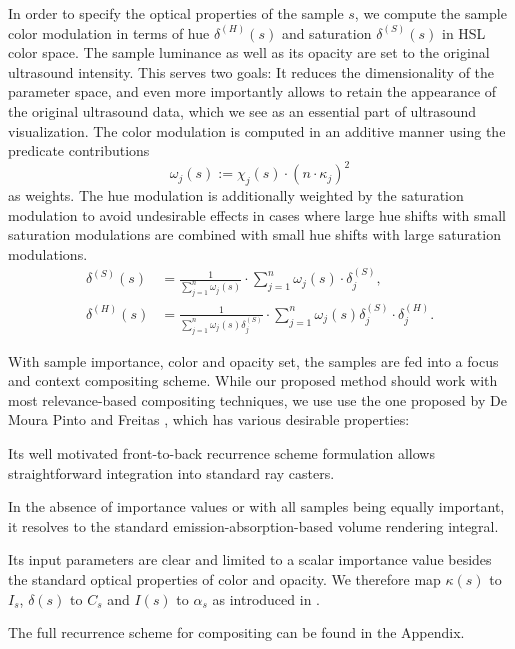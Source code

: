 In order to specify the optical properties of the sample $s$, we compute the sample color modulation in terms of hue $\delta^{(H)}(s)$ and saturation $\delta^{(S)}(s)$ in HSL color space.
The sample luminance as well as its opacity are set to the original ultrasound intensity.
This serves two goals:
It reduces the dimensionality of the parameter space, and even more importantly allows to retain the appearance of the original ultrasound data, which we see as an essential part of ultrasound visualization.
The color modulation is computed in an additive manner using the predicate contributions
\begin{equation}
	\omega_j(s) := \chi_j(s) \cdot (n \cdot \kappa_j)^2
\end{equation}
as weights.
The hue modulation is additionally weighted by the saturation modulation to avoid undesirable effects in cases where large hue shifts with small saturation modulations are combined with small hue shifts with large saturation modulations.
\begin{equation}
	\begin{aligned}
		\delta^{(S)}(s) 	&= \frac{1}{\sum_{j = 1}^n  \omega_j(s)} \cdot \sum_{j = 1}^n  \omega_j(s) \cdot \delta_j^{(S)}, \\
		\delta^{(H)}(s) 	&= \frac{1}{\sum_{j = 1}^n  \omega_j(s) \delta_j^{(S)}} \cdot \sum_{j = 1}^n  \omega_j(s) \delta_j^{(S)} \cdot \delta_j^{(H)}.
	\end{aligned}	
	\label{eq:predicates:classification_color}
\end{equation}

With sample importance, color and opacity set, the samples are fed into a focus and context compositing scheme.
While our proposed method should work with most relevance-based compositing techniques, we use use the one proposed by De Moura Pinto and Freitas \cite{Pinto10}, which has various desirable properties:
\begin{my_list_num}
	\item 
		Its well motivated front-to-back recurrence scheme formulation allows straightforward integration into standard ray casters.
	\item
		In the absence of importance values or with all samples being equally important, it resolves to the standard emission-absorption-based volume rendering integral.
	\item
		Its input parameters are clear and limited to a scalar importance value besides the standard optical properties of color and opacity. 
		We therefore map $\kappa(s)$ to $I_s$, $\delta(s)$ to $C_s$ and $I(s)$ to $\alpha_s$ as introduced in \cite{Pinto10}.
\end{my_list_num}	
The full recurrence scheme for compositing can be found in the Appendix.


